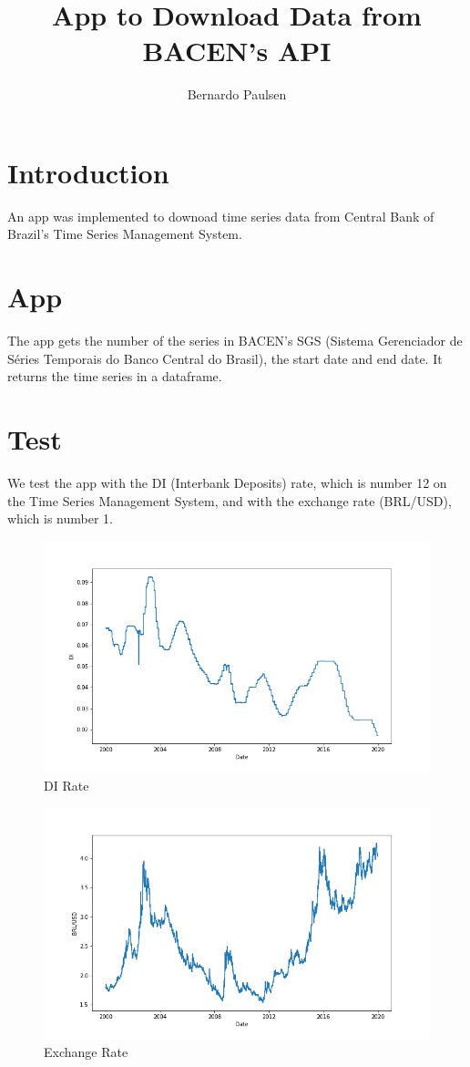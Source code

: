 \documentclass{article}
\title{App to Download Data from BACEN's API}
\author{Bernardo Paulsen}
\begin{document}
\maketitle

\section{Introduction}

An app was implemented to downoad time series data from Central Bank of Brazil's Time Series Management System.

\section{App}

The app gets the number of the series in BACEN's SGS (Sistema Gerenciador de Séries Temporais do Banco Central do Brasil), the start date and end date. It returns the time series in a dataframe.

\section{Test}

We test the app with the DI (Interbank Deposits) rate, which is number 12 on the Time Series Management System, and with the exchange rate (BRL/USD), which is number 1.

\begin{figure}[H]
	\caption{DI Rate}
	\centering
	\includegraphics[width=\textwidth]{di.png}
\end{figure}


\begin{figure}[H]
	\caption{Exchange Rate}
	\centering
	\includegraphics[width=\textwidth]{dol.png}
\end{figure}
\end{document}
